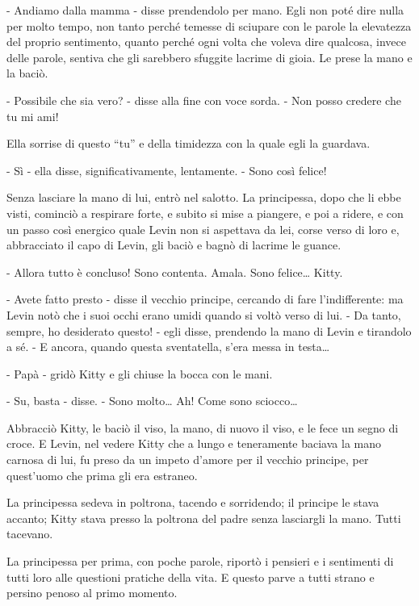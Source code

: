- Andiamo dalla mamma - disse prendendolo per mano. Egli non poté dire nulla per molto tempo, non tanto perché temesse di sciupare con le parole la elevatezza del proprio sentimento, quanto perché ogni volta che voleva dire qualcosa, invece delle parole, sentiva che gli sarebbero sfuggite lacrime di gioia. Le prese la mano e la baciò. 

- Possibile che sia vero? - disse alla fine con voce sorda. - Non posso credere che tu mi ami! 

Ella sorrise di questo ``tu'' e della timidezza con la quale egli la guardava. 

- Sì - ella disse, significativamente, lentamente. - Sono così felice! 

Senza lasciare la mano di lui, entrò nel salotto. La principessa, dopo che li ebbe visti, cominciò a respirare forte, e subito si mise a piangere, e poi a ridere, e con un passo così energico quale Levin non si aspettava da lei, corse verso di loro e, abbracciato il capo di Levin, gli baciò e bagnò di lacrime le guance. 

- Allora tutto è concluso! Sono contenta. Amala. Sono felice\ldots{} Kitty. 

- Avete fatto presto - disse il vecchio principe, cercando di fare l'indifferente: ma Levin notò che i suoi occhi erano umidi quando si voltò verso di lui. - Da tanto, sempre, ho desiderato questo! - egli disse, prendendo la mano di Levin e tirandolo a sé. - E ancora, quando questa sventatella, s'era messa in testa\ldots{} 

- Papà - gridò Kitty e gli chiuse la bocca con le mani. 

- Su, basta - disse. - Sono molto\ldots{} Ah! Come sono sciocco\ldots{} 

Abbracciò Kitty, le baciò il viso, la mano, di nuovo il viso, e le fece un segno di croce. E Levin, nel vedere Kitty che a lungo e teneramente baciava la mano carnosa di lui, fu preso da un impeto d'amore per il vecchio principe, per quest'uomo che prima gli era estraneo. 

\label{xvi-3} 

La principessa sedeva in poltrona, tacendo e sorridendo; il principe le stava accanto; Kitty stava presso la poltrona del padre senza lasciargli la mano. Tutti tacevano. 

La principessa per prima, con poche parole, riportò i pensieri e i sentimenti di tutti loro alle questioni pratiche della vita. E questo parve a tutti strano e persino penoso al primo momento. 

